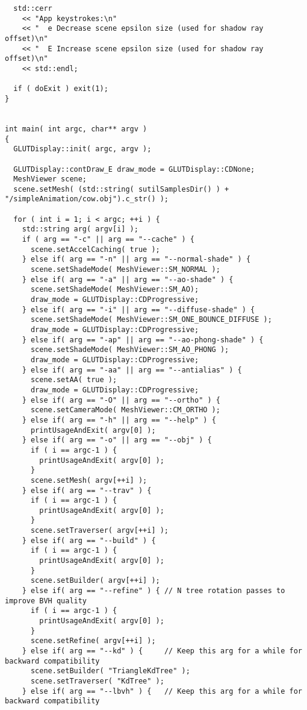 \begin{verbatim}
  std::cerr
    << "App keystrokes:\n"
    << "  e Decrease scene epsilon size (used for shadow ray offset)\n"
    << "  E Increase scene epsilon size (used for shadow ray offset)\n"
    << std::endl;

  if ( doExit ) exit(1);
}


int main( int argc, char** argv ) 
{
  GLUTDisplay::init( argc, argv );
  
  GLUTDisplay::contDraw_E draw_mode = GLUTDisplay::CDNone; 
  MeshViewer scene;
  scene.setMesh( (std::string( sutilSamplesDir() ) + "/simpleAnimation/cow.obj").c_str() );

  for ( int i = 1; i < argc; ++i ) {
    std::string arg( argv[i] );
    if ( arg == "-c" || arg == "--cache" ) {
      scene.setAccelCaching( true );
    } else if( arg == "-n" || arg == "--normal-shade" ) {
      scene.setShadeMode( MeshViewer::SM_NORMAL );
    } else if( arg == "-a" || arg == "--ao-shade" ) {
      scene.setShadeMode( MeshViewer::SM_AO);
      draw_mode = GLUTDisplay::CDProgressive;
    } else if( arg == "-i" || arg == "--diffuse-shade" ) {
      scene.setShadeMode( MeshViewer::SM_ONE_BOUNCE_DIFFUSE );
      draw_mode = GLUTDisplay::CDProgressive;
    } else if( arg == "-ap" || arg == "--ao-phong-shade" ) {
      scene.setShadeMode( MeshViewer::SM_AO_PHONG );
      draw_mode = GLUTDisplay::CDProgressive;
    } else if( arg == "-aa" || arg == "--antialias" ) {
      scene.setAA( true );
      draw_mode = GLUTDisplay::CDProgressive;
    } else if( arg == "-O" || arg == "--ortho" ) {
      scene.setCameraMode( MeshViewer::CM_ORTHO );
    } else if( arg == "-h" || arg == "--help" ) {
      printUsageAndExit( argv[0] ); 
    } else if( arg == "-o" || arg == "--obj" ) {
      if ( i == argc-1 ) {
        printUsageAndExit( argv[0] );
      }
      scene.setMesh( argv[++i] );
    } else if( arg == "--trav" ) {
      if ( i == argc-1 ) {
        printUsageAndExit( argv[0] );
      }
      scene.setTraverser( argv[++i] );
    } else if( arg == "--build" ) {
      if ( i == argc-1 ) {
        printUsageAndExit( argv[0] );
      }
      scene.setBuilder( argv[++i] );
    } else if( arg == "--refine" ) { // N tree rotation passes to improve BVH quality
      if ( i == argc-1 ) {
        printUsageAndExit( argv[0] );
      }
      scene.setRefine( argv[++i] );
    } else if( arg == "--kd" ) {     // Keep this arg for a while for backward compatibility
      scene.setBuilder( "TriangleKdTree" );
      scene.setTraverser( "KdTree" );
    } else if( arg == "--lbvh" ) {   // Keep this arg for a while for backward compatibility

\end{verbatim}
